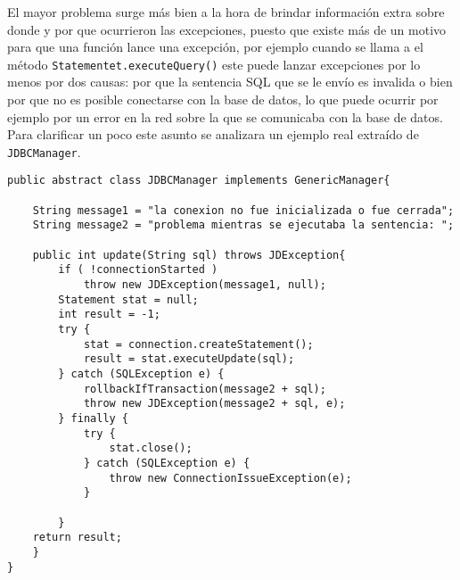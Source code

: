El mayor problema surge más bien a la hora de brindar información extra sobre donde y por que ocurrieron las excepciones, puesto que existe más de un motivo para que una función lance una excepción, por ejemplo cuando se llama a el método \verb=Statementet.executeQuery()= este puede lanzar excepciones por lo menos por dos causas: por que la sentencia SQL que se le envío es invalida o bien por que no es posible conectarse con la base de datos, lo que puede ocurrir por ejemplo por un error en la red sobre la que se comunicaba con la base de datos. Para clarificar un poco este asunto se analizara un ejemplo real extraído de \verb=JDBCManager=.
%
\begin{lstlisting}[title=función extraída de JDBCManager]
public abstract class JDBCManager implements GenericManager{

	String message1 = "la conexion no fue inicializada o fue cerrada";
	String message2 = "problema mientras se ejecutaba la sentencia: ";
	
	public int update(String sql) throws JDException{
		if ( !connectionStarted ) 
			throw new JDException(message1, null);
		Statement stat = null;
		int result = -1;
		try {
			stat = connection.createStatement();
			result = stat.executeUpdate(sql);
		} catch (SQLException e) {
			rollbackIfTransaction(message2 + sql);
			throw new JDException(message2 + sql, e);
		} finally {
			try {
				stat.close();
			} catch (SQLException e) {
				throw new ConnectionIssueException(e);
			}
			
		}
	return result; 
	}
}
\end{lstlisting}
%

